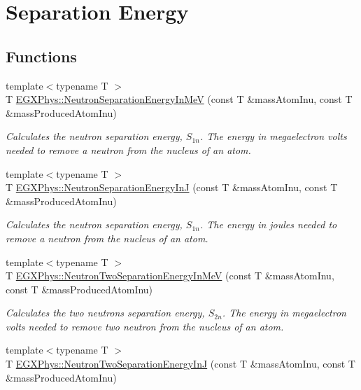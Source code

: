 \hypertarget{group___nuclear_separation_energy}{}\section{Separation Energy}
\label{group___nuclear_separation_energy}
\subsection*{Functions}
\begin{DoxyCompactItemize}
\item 
{\footnotesize template$<$typename T $>$ }\\T \hyperlink{group___nuclear_separation_energy_ga66133edb5809c81dd9fd60e09ebbef79}{E\+G\+X\+Phys\+::\+Neutron\+Separation\+Energy\+In\+MeV} (const T \&mass\+Atom\+Inu, const T \&mass\+Produced\+Atom\+Inu)
\begin{DoxyCompactList}\small\item\em Calculates the neutron separation energy, $S_{1n}$. The energy in megaelectron volts needed to remove a neutron from the nucleus of an atom. \end{DoxyCompactList}\item 
{\footnotesize template$<$typename T $>$ }\\T \hyperlink{group___nuclear_separation_energy_ga14a4bb972ae000ef4ff35f2734ff22d0}{E\+G\+X\+Phys\+::\+Neutron\+Separation\+Energy\+InJ} (const T \&mass\+Atom\+Inu, const T \&mass\+Produced\+Atom\+Inu)
\begin{DoxyCompactList}\small\item\em Calculates the neutron separation energy, $S_{1n}$. The energy in joules needed to remove a neutron from the nucleus of an atom. \end{DoxyCompactList}\item 
{\footnotesize template$<$typename T $>$ }\\T \hyperlink{group___nuclear_separation_energy_ga09985fc876eb632695bfbc1f2f325401}{E\+G\+X\+Phys\+::\+Neutron\+Two\+Separation\+Energy\+In\+MeV} (const T \&mass\+Atom\+Inu, const T \&mass\+Produced\+Atom\+Inu)
\begin{DoxyCompactList}\small\item\em Calculates the two neutrons separation energy, $S_{2n}$. The energy in megaelectron volts needed to remove two neutron from the nucleus of an atom. \end{DoxyCompactList}\item 
{\footnotesize template$<$typename T $>$ }\\T \hyperlink{group___nuclear_separation_energy_ga293ac9428420a0adf4235048dbe529b4}{E\+G\+X\+Phys\+::\+Neutron\+Two\+Separation\+Energy\+InJ} (const T \&mass\+Atom\+Inu, const T \&mass\+Produced\+Atom\+Inu)

\end{DoxyCompactItemize}
